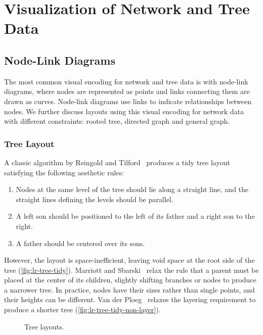 \section{Visualization of Network and Tree Data}

\subsection{Node-Link Diagrams}
The most common visual encoding for network and tree data is with node-link diagrams, where nodes are represented as points and links connecting them are drawn as curves. Node-link diagrams use links to indicate relationships between nodes. We further discuss layouts using this visual encoding for network data with different constraints: rooted tree, directed graph and general graph.

\subsubsection{Tree Layout}
A classic algorithm by Reingold and Tilford~\cite{Reingold1981} produces a tidy tree layout satisfying the following aesthetic rules:
\begin{enumerate}
	\item Nodes at the same level of the tree should lie along a straight line, and the straight lines defining the levels should be parallel.
	\item A left son should be positioned to the left of its father and a right son to the right.
	\item A father should be centered over its sons.
\end{enumerate} 

However, the layout is space-inefficient, leaving void space at the root side of the tree (\autoref{fig:lr-tree-tidy}). Marriott and Sbarski~\cite{Marriott2007} relax the rule that a parent must be placed at the center of its children, slightly shifting branches or nodes to produce a narrower tree. In practice, nodes have their sizes rather than single points, and their heights can be different. Van der Ploeg~\cite{VanderPloeg2014} relaxes the layering requirement to produce a shorter tree (\autoref{fig:lr-tree-tidy-non-layer}).

\begin{figure}[!htb]
\centering
{}
\hfill
{}
\caption{Tree layouts.}
\end{figure}

